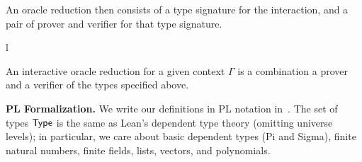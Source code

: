 An oracle reduction then consists of a type signature for the interaction, and a pair of prover and
verifier for that type signature.

l
\begin{definition}
    \label{def:interactive_oracle_reduction}
    An interactive oracle reduction for a given context $\Gamma$ is a combination a prover and a verifier of the types specified above.
\end{definition}

\textbf{PL Formalization.} We write our definitions in PL notation in~. The set of types $\mathsf{Type}$ is the same as Lean's dependent type theory (omitting universe levels); in particular, we care about basic dependent types (Pi and Sigma), finite natural numbers, finite fields, lists, vectors, and polynomials.

